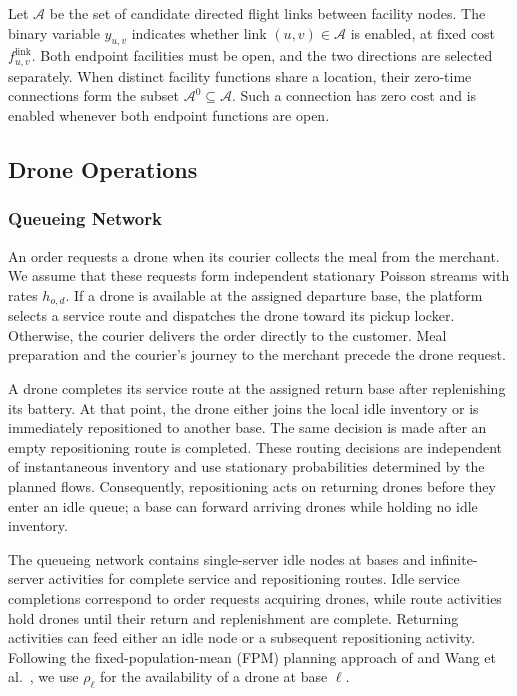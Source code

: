 \documentclass[final,3p,authoryear]{elsarticle}
\begin{document}
Let $\mathcal A$ be the set of candidate directed flight links between facility nodes.
The binary variable $y_{u,v}$ indicates whether link $(u,v)\in\mathcal A$ is enabled, at fixed cost $f_{u,v}^{\mathrm{link}}$.
Both endpoint facilities must be open, and the two directions are selected separately.
When distinct facility functions share a location, their zero-time connections form the subset $\mathcal A^0\subseteq\mathcal A$.
Such a connection has zero cost and is enabled whenever both endpoint functions are open.

\subsection{Drone Operations}
\label{subsec:path_operations}

\subsubsection{Queueing Network}
\label{subsubsec:path_queue}

An order requests a drone when its courier collects the meal from the merchant.
We assume that these requests form independent stationary Poisson streams with rates $h_{o,d}$.
If a drone is available at the assigned departure base, the platform selects a service route and dispatches the drone toward its pickup locker.
Otherwise, the courier delivers the order directly to the customer.
Meal preparation and the courier's journey to the merchant precede the drone request.

A drone completes its service route at the assigned return base after replenishing its battery.
At that point, the drone either joins the local idle inventory or is immediately repositioned to another base.
The same decision is made after an empty repositioning route is completed.
These routing decisions are independent of instantaneous inventory and use stationary probabilities determined by the planned flows.
Consequently, repositioning acts on returning drones before they enter an idle queue; a base can forward arriving drones while holding no idle inventory.

The queueing network contains single-server idle nodes at bases and infinite-server activities for complete service and repositioning routes.
Idle service completions correspond to order requests acquiring drones, while route activities hold drones until their return and replenishment are complete.
Returning activities can feed either an idle node or a subsequent repositioning activity.
Following the fixed-population-mean (FPM) planning approach of \citet{heServiceRegion2017M&SOM} and Wang et al.~\citeyearpar{wangVertiportPlanning2022M&SOM}, we use $\rho_\ell$ for the availability of a drone at base $\ell$.
\end{document}
